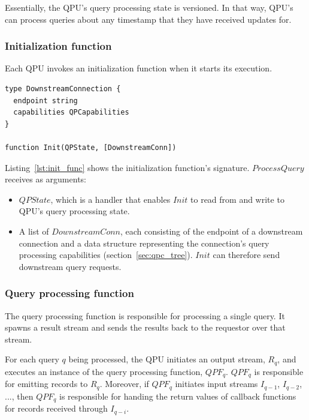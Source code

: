 Essentially, the QPU's query processing state is versioned.
In that way, QPU's can process queries about any timestamp that they have received updates for.


\subsubsection{Initialization function}
\label{sec:initialization_func}

Each QPU invokes an initialization function when it starts its execution.

\begin{lstlisting}[caption={Initialization function signature},captionpos=b,label={lst:init_func}]
type DownstreamConnection {
  endpoint string
  capabilities QPCapabilities
}

function Init(QPState, [DownstreamConn])
\end{lstlisting}

\noindent
Listing~\ref{lst:init_func} shows the initialization function's signature.
$ProcessQuery$ receives as arguments:
\begin{itemize}
  \item $QPState$, which is a handler that enables $Init$ to read from and write to QPU's query processing state.

  \item A list of $DownstreamConn$, each consisting of the endpoint of a downstream connection and a data structure
  representing the connection's query processing capabilities (section~\ref{sec:qpc_tree}).
  $Init$ can therefore send downstream query requests.
\end{itemize}


\subsubsection{Query processing function}
\label{sec:query_processing_func}

The query processing function is responsible for processing a single query.
It spawns a result stream and sends the results back to the requestor over that stream.

For each query $q$ being processed, the QPU initiates an output stream, $R_q$,
and executes an instance of the query processing function, $QPF_q$.
$QPF_q$ is responsible for emitting records to $R_q$.
Moreover, if $QPF_q$ initiates input streams $I_{q-1}$, $I_{q-2}$, ..., then $QPF_q$ is responsible for handing the return
values of callback functions for records received through $I_{q-i}$.


